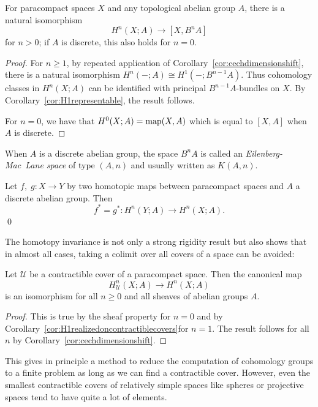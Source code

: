 \documentclass[a4paper,openany]{scrbook}
\begin{document}
\begin{corollary}\label{cor:cohomologyrepresentable}
For paracompact spaces $X$ and any topological abelian group $A$, there is a natural isomorphism
\[
H^n(X;A) \to [X,B^nA]
\]
for $n>0$; if $A$ is discrete, this also holds for $n=0$.
\end{corollary}
\begin{proof}
For $n\geq 1$, by repeated application of Corollary~\ref{cor:cechdimensionshift}, there is a natural isomorphism $H^n(-;A) \cong H^1(-;B^{n-1}A)$. Thus cohomology classes in $H^n(X;A)$ can be identified with principal $B^{n-1}A$-bundles on $X$. By Corollary~\ref{cor:H1representable}, the result follows.

For $n=0$, we have that $H^0(X;A) = \operatorname{map}(X,A)$ which is equal to $[X,A]$ when $A$ is discrete.
\end{proof}

\begin{defn}
When $A$ is a discrete abelian group, the space $B^nA$ is called an \emph{Eilenberg-Mac~Lane space} of type $(A,n)$ and usually written as $K(A,n)$.
\end{defn}

\begin{corollary}\label{cor:cechcohomologyhomotopyinvariance}
Let $f,\;g\colon X \to Y$ by two homotopic maps between paracompact spaces and $A$ a discrete abelian group. Then
\[
f^*=g^*\colon H^n(Y;A) \to H^n(X;A).
\] \qed 
\end{corollary}


The homotopy invariance is not only a strong rigidity result but also shows that in almost all cases, taking a colimit over all covers of a space can be avoided:

\begin{thm}\label{thm:contractible-covers}
Let $\mathcal U$ be a contractible cover of a paracompact space. Then the canonical map
\[
H^n_{\mathcal U}(X;A) \to H^n(X;A) 
\]
is an isomorphism for all $n \geq 0$ and all sheaves of abelian groups $A$.
\end{thm}
\begin{proof}
This is true by the sheaf property for $n=0$ and by Corollary~\ref{cor:H1realizedoncontractiblecovers}for $n=1$. The result follows for all $n$ by Corollary~\ref{cor:cechdimensionshift}. 
\end{proof}

This gives in principle a method to reduce the computation of cohomology groups to a finite problem as long as we can find a contractible cover. However, even the smallest contractible covers of relatively simple spaces like spheres or projective spaces tend to have quite a lot of elements.
\end{document}
